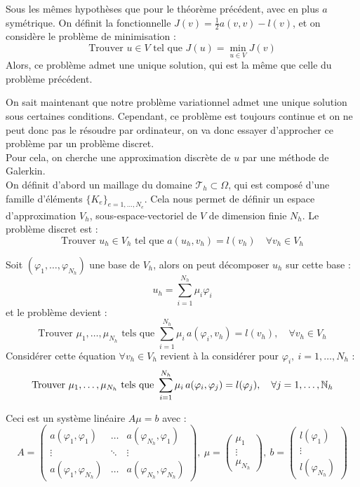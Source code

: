 \begin{thm}
Sous les mêmes hypothèses que pour le théorème précédent, avec en plus $a$ symétrique. On définit la fonctionnelle $J(v)=\frac{1}{2}a(v,v)-l(v)$, et on considère le problème de minimisation :
\[ \mbox{Trouver }u\in V \mbox{ tel que } J(u)=\min_{u\in V} J(v) \]
Alors, ce problème admet une unique solution, qui est la même que celle du problème précédent.
\end{thm}

On sait maintenant que notre problème variationnel admet une unique solution sous certaines conditions. Cependant, ce problème est toujours continue et on ne peut donc pas le résoudre par ordinateur, on va donc essayer d'approcher ce problème par un problème discret.\\
Pour cela, on cherche une approximation discrète de $u$ par une méthode de Galerkin.\\

On définit d'abord un maillage du domaine $\mathcal{T}_h\subset\Omega$, qui est composé d'une famille d'éléments $\{K_e\}_{e=1,\dots,N_e}$. Cela nous permet de définir un espace d'approximation $V_h$, sous-espace-vectoriel de $V$ de dimension finie $N_h$. Le problème discret est :
\[ \mbox{Trouver } u_h\in V_h \mbox{ tel que } a(u_h,v_h)=l(v_h)\quad \forall v_h\in V_h \]

Soit $(\varphi_1,\dots,\varphi_{N_h})$ une base de $V_h$, alors on peut décomposer $u_h$ sur cette base :
\[ u_h = \sum_{i=1}^{N_h} \mu_i\varphi_i \]
et le problème devient :
\[ \mbox{Trouver } \mu_1,\dots,\mu_{N_h} \mbox{ tels que } \sum_{i=1}^{N_h} \mu_i\,a(\varphi_i,v_h)=l(v_h),\quad \forall v_h\in V_h \]
Considérer cette équation $\forall v_h\in V_h$ revient à la considérer pour $\varphi_i,\ i=1,\dots,N_h$ :
\[ \mbox{Trouver } \mu_1,\dots,\mu_{N_h} \mbox{ tels que } \sum_{i=1}^{N_h} \mu_i\,a(\varphi_i,\varphi_j)=l(\varphi_j),\quad \forall j=1,\dots,{\mathbb{N}}_h \]

Ceci est un système linéaire $A\mu = b$ avec :
\[ A=\begin{pmatrix} a(\varphi_1,\varphi_1) & \dots & a(\varphi_{N_h},\varphi_1)\\
\vdots & \ddots & \vdots\\
a(\varphi_1,\varphi_{N_h}) & \dots & a(\varphi_{N_h},\varphi_{N_h}) \end{pmatrix},\ 
\mu=\begin{pmatrix} \mu_1\\ \vdots\\ \mu_{N_h}\end{pmatrix},\ 
b=\begin{pmatrix} l(\varphi_1)\\ \vdots\\ l(\varphi_{N_h}) \end{pmatrix}\]

